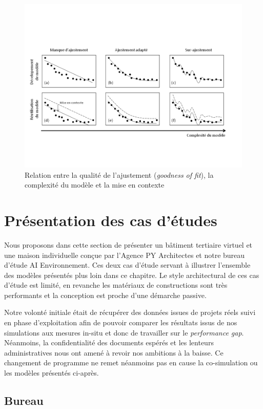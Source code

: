 \begin{figure}[H]
\centering
\includegraphics[scale=0.62]{Images/ComplexityAndContextualization}
\caption{Relation entre la qualité de l'ajustement (\textit{goodness of fit}), la complexité du modèle et la mise en contexte}
\label{fig:Fit-to-purpose}
\end{figure}

\section{Présentation des cas d'études}

Nous proposons dans cette section de présenter un bâtiment tertiaire virtuel et une maison individuelle conçue par l'Agence PY Architectes et notre bureau d'étude AI Environnement. Ces deux cas d'étude servant à illustrer l'ensemble des modèles présentés plus loin dans ce chapitre. Le style architectural de ces cas d'étude est limité, en revanche les matériaux de constructions sont très performants et la conception est proche d'une démarche passive.

Notre volonté initiale était de récupérer des données issues de projets réels suivi en phase d'exploitation afin de pouvoir comparer les résultats issus de nos simulations aux mesures in-situ et donc de travailler sur le \textit{performance gap}. Néanmoins, la confidentialité des documents espérés et les lenteurs administratives nous ont amené à revoir nos ambitions à la baisse. Ce changement de programme ne remet néanmoins pas en cause la co-simulation ou les modèles présentés ci-après.

\subsection{Bureau}

